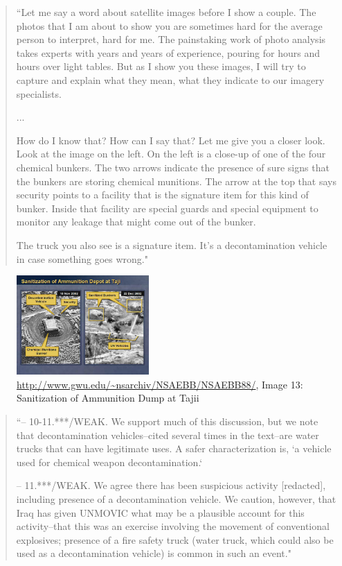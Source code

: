 \documentclass[11pt]{report}
\begin{document}
\begin{quote}
``Let me say a word about satellite images before I show a couple. The photos that I am about to show you are sometimes hard for the average person to interpret, hard for me. The painstaking work of photo analysis takes experts with years and years of experience, pouring for hours and hours over light tables. But as I show you these images, I will try to capture and explain what they mean, what they indicate to our imagery specialists.

...

How do I know that? How can I say that? Let me give you a closer look. Look at the image on the left. On the left is a close-up of one of the four chemical bunkers. The two arrows indicate the presence of sure signs that the bunkers are storing chemical munitions. The arrow at the top that says security points to a facility that is the signature item for this kind of bunker. Inside that facility are special guards and special equipment to monitor any leakage that might come out of the bunker.

The truck you also see is a signature item. It's a decontamination vehicle in case something goes wrong."
	\cite{guardian2003powell}
\end{quote}

\begin{figure}
	\begin{flushright}
		\includegraphics[width=0.45\textwidth]{images/iraq-image-13.jpg}
		\url{http://www.gwu.edu/~nsarchiv/NSAEBB/NSAEBB88/}, Image 13: Sanitization of Ammunition Dump at Tajii	
	\end{flushright}
\end{figure}

\begin{quote}
	``-- 10-11.***/WEAK. We support much of this discussion, but we note that decontamination vehicles--cited several times in the text--are water trucks that can have legitimate uses. A safer characterization is, `a vehicle used for chemical weapon decontamination.`

-- 11.***/WEAK. We agree there has been suspicious activity [redacted], including presence of a decontamination vehicle. We caution, however, that Iraq has given UNMOVIC what may be a plausible account for this activity--that this was an exercise involving the movement of conventional explosives; presence of a fire safety truck (water truck, which could also be used as a decontamination vehicle) is common in such an event."
	\cite{senate2004report}
\end{quote} 
\end{document}

